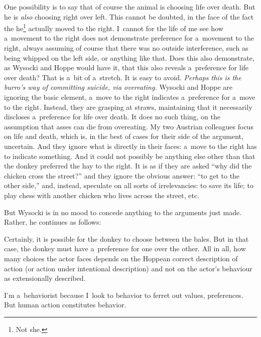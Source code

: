 One possibility is to say that of course the animal is choosing life over death. But he is \textit{also} choosing right over left. This cannot be doubted, in the face of the fact the he\footnote{Not she.} actually moved to the right. I~cannot for the life of me see how a~movement to the right does not demonstrate preference for a~movement to the right, always assuming of course that there was no outside interference, such as being whipped on the left side, or anything like that. Does this also demonstrate, as Wysocki and Hoppe would have it, that this also reveals a~preference for life over death? That is a~bit of a~stretch. It is easy to avoid. \textit{Perhaps this is the burro's way of committing suicide, via overeating.} Wysocki and Hoppe are ignoring the basic element, a~move to the right indicates a~preference for a~move to the right. Instead, they are grasping at straws, maintaining that it necessarily discloses a~preference for life over death. It does no such thing, on the assumption that asses can die from overeating. My two Austrian colleagues focus on life and death, which is, in the best of cases for their side of the argument, uncertain. And they ignore what is directly in their faces: a~move to the right has to indicate something. And it could not possibly be anything else other than that the donkey preferred the hay to the right. It is as if they are asked ``why did the chicken cross the street?'' and they ignore the obvious answer: ``to get to the other side,'' and, instead, speculate on all sorts of irrelevancies: to save its life; to play chess with another chicken who lives across the street, etc.



But Wysocki is in no mood to concede anything to the arguments just made. Rather, he continues as follows:



Certainly, it is possible for the donkey to choose between the bales. But in that case, the donkey must have a~preference for one over the other. All in all, how many choices the actor faces depends on the Hoppean 
\parencite*[][]{hoppe_must_2005} %
 correct description of action (or action under intentional description) and not on the actor's behaviour as extensionally described.



I'm a~behaviorist because I~look to behavior to ferret out values, preferences. But human action constitutes behavior.



